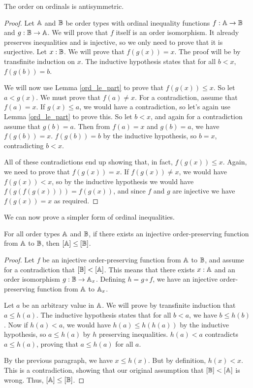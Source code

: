 \documentclass[../../math.tex]{subfiles}
\begin{document}
\begin{instance}
    The order on ordinals is antisymmetric.
\end{instance}
\begin{proof}
    Let $\mathbb{A}$ and $\mathbb{B}$ be order types with ordinal inequality functions $f : \mathbb{A}
    \to \mathbb{B}$ and $g : \mathbb{B} \to \mathbb{A}$.  We will prove that $f$ itself is an order
    isomorphism.  It already preserves inequalities and is injective, so we only
    need to prove that it is surjective.  Let $x : \mathbb{B}$.  We will prove that
    $f(g(x)) = x$.  The proof will be by transfinite induction on $x$.  The
    inductive hypothesis states that for all $b < x$, $f(g(b)) = b$.

    We will now use Lemma \ref{ord_le_part} to prove that $f(g(x)) \leq x$.  So
    let $a < g(x)$.  We must prove that $f(a) \neq x$.  For a contradiction,
    assume that $f(a) = x$.  If $g(x) \leq a$, we would have a contradiction, so
    let's again use Lemma \ref{ord_le_part} to prove this.  So let $b < x$, and
    again for a contradiction assume that $g(b) = a$.  Then from $f(a) = x$ and
    $g(b) = a$, we have $f(g(b)) = x$.  $f(g(b)) = b$ by the inductive
    hypothesis, so $b = x$, contradicting $b < x$.

    All of these contradictions end up showing that, in fact, $f(g(x)) \leq x$.
    Again, we need to prove that $f(g(x)) = x$.  If $f(g(x)) \neq x$, we would
    have $f(g(x)) < x$, so by the inductive hypothesis we would have
    $f(g(f(g(x)))) = f(g(x))$, and since $f$ and $g$ are injective we have
    $f(g(x)) = x$ as required.
\end{proof}

We can now prove a simpler form of ordinal inequalities.

\begin{lemma} \label{ord_le_simpl}
    For all order types $\mathbb{A}$ and $\mathbb{B}$, if there exists an injective
    order-preserving function from $\mathbb{A}$ to $\mathbb{B}$, then $[\mathbb{A}] \leq [\mathbb{B}]$.
\end{lemma}
\begin{proof}
    Let $f$ be an injective order-preserving function from $\mathbb{A}$ to $\mathbb{B}$, and
    assume for a contradiction that $[\mathbb{B}] < [\mathbb{A}]$.  This means that there exists
    $x : \mathbb{A}$ and an order isomorphism $g : \mathbb{B} \to \mathbb{A}_x$.  Defining $h = g \circ
    f$, we have an injective order-preserving function from $\mathbb{A}$ to $\mathbb{A}_x$.

    Let $a$ be an arbitrary value in $\mathbb{A}$.  We will prove by transfinite
    induction that $a \leq h(a)$.  The inductive hypothesis states that for all
    $b < a$, we have $b \leq h(b)$.  Now if $h(a) < a$, we would have $h(a) \leq
    h(h(a))$ by the inductive hypothesis, so $a \leq h(a)$ by $h$ preserving
    inequalities.  $h(a) < a$ contradicts $a \leq h(a)$, proving that $a \leq
    h(a)$ for all $a$.

    By the previous paragraph, we have $x \leq h(x)$.  But by definition, $h(x)
    < x$.  This is a contradiction, showing that our original assumption that
    $[\mathbb{B}] < [\mathbb{A}]$ is wrong.  Thus, $[\mathbb{A}] \leq [\mathbb{B}]$.
\end{proof}
\end{document}
